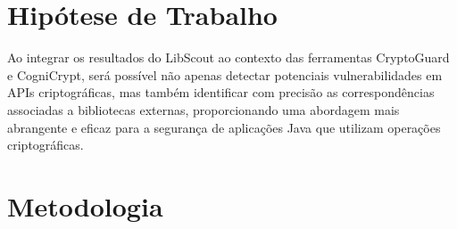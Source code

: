 \section{Hipótese de Trabalho}

Ao integrar os resultados do LibScout ao contexto das ferramentas CryptoGuard e CogniCrypt, será possível não apenas detectar potenciais vulnerabilidades em APIs criptográficas, mas também identificar com precisão as correspondências associadas a bibliotecas externas, proporcionando uma abordagem mais abrangente e eficaz para a segurança de aplicações Java que utilizam operações criptográficas.

\section{Metodologia}

